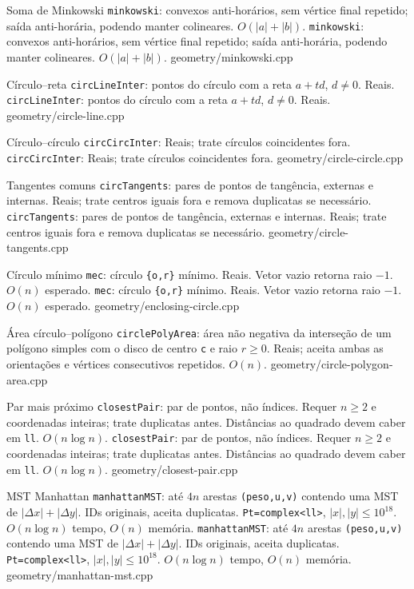 \templateentry
{Soma de Minkowski}
{\texttt{minkowski}: convexos anti-horários, sem vértice final repetido; saída anti-horária, podendo manter colineares. $O(|a|+|b|)$.}
{\texttt{minkowski}: convexos anti-horários, sem vértice final repetido; saída anti-horária, podendo manter colineares. $O(|a|+|b|)$.}
{geometry/minkowski.cpp}

\templateentry
{Círculo--reta}
{\texttt{circLineInter}: pontos do círculo com a reta $a+td$, $d\ne0$. Reais.}
{\texttt{circLineInter}: pontos do círculo com a reta $a+td$, $d\ne0$. Reais.}
{geometry/circle-line.cpp}

\templateentry
{Círculo--círculo}
{\texttt{circCircInter}: Reais; trate círculos coincidentes fora.}
{\texttt{circCircInter}: Reais; trate círculos coincidentes fora.}
{geometry/circle-circle.cpp}

\templateentry
{Tangentes comuns}
{\texttt{circTangents}: pares de pontos de tangência, externas e internas. Reais; trate centros iguais fora e remova duplicatas se necessário.}
{\texttt{circTangents}: pares de pontos de tangência, externas e internas. Reais; trate centros iguais fora e remova duplicatas se necessário.}
{geometry/circle-tangents.cpp}

\templateentry
{Círculo mínimo}
{\texttt{mec}: círculo \texttt{\{o,r\}} mínimo. Reais. Vetor vazio retorna raio $-1$. $O(n)$ esperado.}
{\texttt{mec}: círculo \texttt{\{o,r\}} mínimo. Reais. Vetor vazio retorna raio $-1$. $O(n)$ esperado.}
{geometry/enclosing-circle.cpp}

\ifextended

\templateentry
{Área círculo--polígono}
{}
{\texttt{circlePolyArea}: área não negativa da interseção de um polígono simples com o disco de centro \texttt{c} e raio $r\ge0$. Reais; aceita ambas as orientações e vértices consecutivos repetidos. $O(n)$.}
{geometry/circle-polygon-area.cpp}

\fi

\templateentry
{Par mais próximo}
{\texttt{closestPair}: par de pontos, não índices. Requer $n\ge2$ e coordenadas inteiras; trate duplicatas antes. Distâncias ao quadrado devem caber em \texttt{ll}. $O(n\log n)$.}
{\texttt{closestPair}: par de pontos, não índices. Requer $n\ge2$ e coordenadas inteiras; trate duplicatas antes. Distâncias ao quadrado devem caber em \texttt{ll}. $O(n\log n)$.}
{geometry/closest-pair.cpp}

\templateentry
{MST Manhattan}
{\texttt{manhattanMST}: até $4n$ arestas \texttt{(peso,u,v)} contendo uma MST de $|\Delta x|+|\Delta y|$. IDs originais, aceita duplicatas. \texttt{Pt=complex<ll>}, $|x|,|y|\le10^{18}$. $O(n\log n)$ tempo, $O(n)$ memória.}
{\texttt{manhattanMST}: até $4n$ arestas \texttt{(peso,u,v)} contendo uma MST de $|\Delta x|+|\Delta y|$. IDs originais, aceita duplicatas. \texttt{Pt=complex<ll>}, $|x|,|y|\le10^{18}$. $O(n\log n)$ tempo, $O(n)$ memória.}
{geometry/manhattan-mst.cpp}

